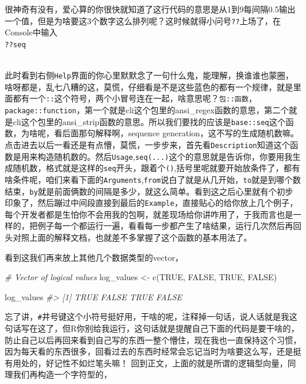 \documentclass[
]{book}
\newenvironment{Shaded}{\begin{snugshade}}{\end{snugshade}}
\newcommand{\CommentTok}[1]{\textcolor[rgb]{0.56,0.35,0.01}{\textit{#1}}}
\newcommand{\ConstantTok}[1]{\textcolor[rgb]{0.00,0.00,0.00}{#1}}
\newcommand{\FunctionTok}[1]{\textcolor[rgb]{0.00,0.00,0.00}{#1}}
\newcommand{\NormalTok}[1]{#1}
\newcommand{\OtherTok}[1]{\textcolor[rgb]{0.56,0.35,0.01}{#1}}
\begin{document}
很神奇有没有，爱心算的你很快就知道了这行代码的意思是从1到9每间隔0.5输出一个值，但是为啥要这3个数字这么排列呢？这时候就得小问号\texttt{??}上场了，在Console中输入\\
\texttt{??seq}\strut \\
此时看到右侧\texttt{Help}界面的你心里默默念了一句什么鬼，能理解，换谁谁也蒙圈，啥呀都是，乱七八糟的这，莫慌，仔细看是不是这些蓝色的都有一个规律，就是里面都有一个\texttt{::}这个符号，两个小冒号连在一起，啥意思呢？\texttt{包::函数}，\texttt{package::function}，第一个就是cli这个包里的ansi\_regex函数的意思，第二个就是cli这个包里的ansi\_strip函数的意思。所以我们要找的应该是\texttt{base::seq}这个函数，为啥呢，看后面那句解释啊，sequence generation，这不写的生成随机数嘛。\\
点击进去以后一看还是有点懵，莫慌，一步步来，首先看\texttt{Description}知道这个函数是用来构造随机数的。然后\texttt{Usage},\texttt{seq(...)}这个的意思就是告诉你，你要用我生成随机数，格式就是这样的\texttt{seq}开头，跟着个\texttt{()},括号里呢就要开始放条件了，都有啥条件呢，咱们来看下面的\texttt{Arguments},\texttt{from}说白了就是从几开始，\texttt{to}就是到哪个数结束，\texttt{by}就是前面俩数的间隔是多少，就这么简单。看到这之后心里就有个初步印象了，然后蹦过中间段直接到最后的\texttt{Example}，直接贴心的给你放上几个例子，每个开发者都是生怕你不会用我的包啊，就差现场给你讲咋用了，于我而言也是一样的，把例子每一个都运行一遍，看看每一步都产生了啥结果，运行几次然后再回头对照上面的解释文档，也就差不多掌握了这个函数的基本用法了。

看到这我们再来放上其他几个数据类型的vector，

\begin{Shaded}
\begin{Highlighting}[]
\CommentTok{\# Vector of logical values}
\NormalTok{log\_values }\OtherTok{\textless{}{-}} \FunctionTok{c}\NormalTok{(}\ConstantTok{TRUE}\NormalTok{, }\ConstantTok{FALSE}\NormalTok{, }\ConstantTok{TRUE}\NormalTok{, }\ConstantTok{FALSE}\NormalTok{)}

\NormalTok{log\_values}
\CommentTok{\#\textgreater{} [1]  TRUE FALSE  TRUE FALSE}
\end{Highlighting}
\end{Shaded}

忘了讲，\texttt{\#}井号键这个小符号挺好用，干啥的呢，注释掉一句话，说人话就是我这句话写在这了，但R你别给我运行，这句话就是提醒自己下面的代码是要干啥的，防止自己以后再回来看到自己写的东西一整个懵住，现在我也一直保持这个习惯，因为每天看的东西很多，回看过去的东西时经常会忘记当时为啥要这么写，还是挺有用处的，好记性不如烂笔头嘛！
回到正文，上面的就是所谓的逻辑型向量，同理我们再构造一个字符型的，
\end{document}
